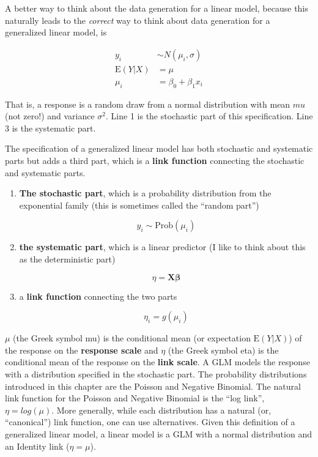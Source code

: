 \documentclass[]{book}
\providecommand{\tightlist}{%
  \setlength{\itemsep}{0pt}\setlength{\parskip}{0pt}}
\begin{document}
A better way to think about the data generation for a linear model,
because this naturally leads to the \emph{correct} way to think about
data generation for a generalized linear model, is

\begin{align}
y_i &\sim N(\mu_i, \sigma)\\
\mathrm{E}(Y|X) &= \mu\\
\mu_i &= \beta_0 + \beta_1 x_i
\label{eq:lm-spec2}
\end{align}

That is, a response is a random draw from a normal distribution with
mean \(mu\) (not zero!) and variance \(\sigma^2\). Line 1 is the
stochastic part of this specification. Line 3 is the systematic part.

The specification of a generalized linear model has both stochastic and
systematic parts but adds a third part, which is a \textbf{link
function} connecting the stochastic and systematic parts.

\begin{enumerate}
\def\labelenumi{\arabic{enumi}.}
\tightlist
\item
  \textbf{The stochastic part}, which is a probability distribution from
  the exponential family (this is sometimes called the ``random part'')

  \begin{equation}
  y_i \sim \mathrm{Prob}(\mu_i)
  \end{equation}
\item
  \textbf{the systematic part}, which is a linear predictor (I like to
  think about this as the deterministic part)

  \begin{equation}
  \eta=\mathbf{X}\boldsymbol{\beta}
  \end{equation}
\item
  a \textbf{link function} connecting the two parts

  \begin{equation}
  \eta_i = g(\mu_i)
  \end{equation}
\end{enumerate}

\(\mu\) (the Greek symbol mu) is the conditional mean (or expectation
\(\mathrm{E}(Y|X)\)) of the response on the \textbf{response scale} and
\(\eta\) (the Greek symbol eta) is the conditional mean of the response
on the \textbf{link scale}. A GLM models the response with a
distribution specified in the stochastic part. The probability
distributions introduced in this chapter are the Poisson and Negative
Binomial. The natural link function for the Poisson and Negative
Binomial is the ``log link'', \(\eta = log(\mu)\). More generally, while
each distribution has a natural (or, ``canonical'') link function, one
can use alternatives. Given this definition of a generalized linear
model, a linear model is a GLM with a normal distribution and an
Identity link (\(\eta = \mu\)).
\end{document}
